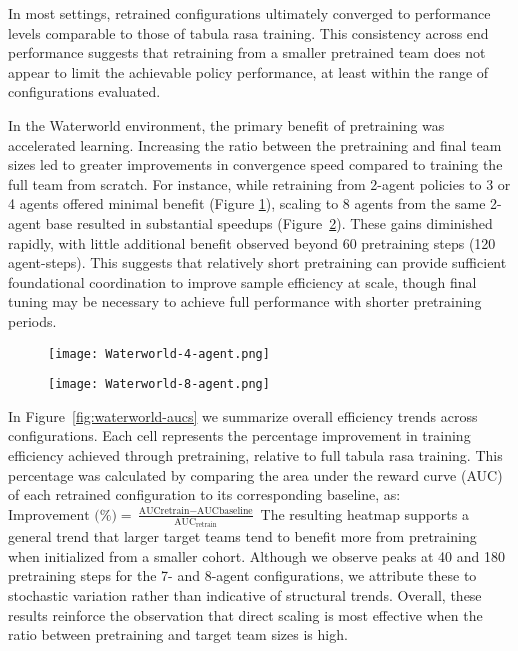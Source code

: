 \documentclass{article}
\begin{document}
In most settings, retrained configurations ultimately converged to 
performance levels comparable to those of tabula rasa training.
This consistency across end performance suggests that retraining from a smaller 
pretrained team does not appear to limit the achievable policy performance, 
at least within the range of configurations evaluated.

In the Waterworld environment, the primary benefit of pretraining was accelerated learning. 
Increasing the ratio between the pretraining and final team sizes led to greater improvements 
in convergence speed compared to training the full team from scratch. For instance, 
while retraining from 2-agent policies to 3 or 4 agents offered minimal benefit 
(Figure \ref{fig:waterworld-4}), scaling to 8 agents from the same 2-agent base resulted in 
substantial speedups (Figure~\ref{fig:waterworld-8}). These gains diminished rapidly, 
with little additional benefit observed beyond 60 pretraining steps (120 agent-steps).
This suggests that relatively short pretraining can provide sufficient foundational 
coordination to improve sample efficiency at scale, though final tuning may 
be necessary to achieve full performance with shorter pretraining periods.

\begin{figure}[!h]
    \centering
    \texttt{[image: Waterworld-4-agent.png]}
    \caption{}
    \label{fig:waterworld-4}
\end{figure}

\begin{figure}[!h]
    \centering
    \texttt{[image: Waterworld-8-agent.png]}
    \caption{}
    \label{fig:waterworld-8}
\end{figure}

In Figure~\ref{fig:waterworld-aucs} we summarize overall efficiency trends across configurations. 
Each cell represents the percentage improvement in training efficiency 
achieved through pretraining, relative to full tabula rasa training.
This percentage was calculated by comparing the area under the reward curve 
(AUC) of each retrained configuration to its corresponding baseline, as: $\text{Improvement (\%)} 
= \frac{\text{AUC}{\text{retrain}} - \text{AUC}{\text{baseline}}}{\text{AUC}_{\text{retrain}}}$
The resulting heatmap supports a general trend that larger target teams tend to 
benefit more from pretraining when initialized from a smaller cohort.
Although we observe peaks at 40 and 180 pretraining steps for the 7- and 8-agent configurations, 
we attribute these to stochastic variation rather than indicative of structural trends.
Overall, these results reinforce the observation that direct scaling is most effective 
when the ratio between pretraining and target team sizes is high.
\end{document}
